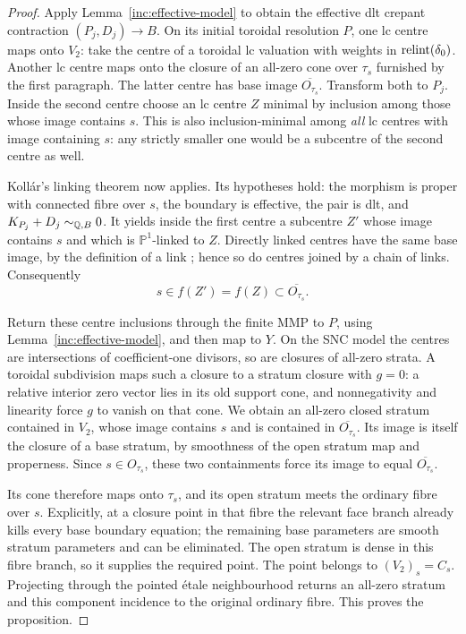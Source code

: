 \begin{proof}
Apply Lemma~\ref{inc:effective-model} to obtain the effective dlt
crepant contraction $(P_j,D_j)\to B$.  On its initial toroidal
resolution $P$, one lc centre maps onto $V_2$: take the centre of
a toroidal lc valuation with weights in $\operatorname{relint}(\delta_0)$.
Another lc centre maps onto the closure of an all-zero cone over
$\tau_s$ furnished by the first paragraph.  The latter centre has
base image $\overline{O_{\tau_s}}$.  Transform both to $P_j$.
Inside the second centre choose an lc centre $Z$ minimal by inclusion
among those whose image contains $s$.  This is also inclusion-minimal
among \emph{all} lc centres with image containing $s$: any strictly
smaller one would be a subcentre of the second centre as well.

Koll\'{a}r's linking theorem \cite[Theorem~10]{KollarSources} now
applies.  Its hypotheses hold: the morphism is proper with connected
fibre over $s$, the boundary is effective, the pair is dlt, and
$K_{P_j}+D_j\sim_{\mathbb Q,B}0$.  It yields inside the first centre a
subcentre $Z'$ whose image contains $s$ and which is $\mathbb P^1$-linked
to $Z$.  Directly linked centres have the same base image, by the
definition of a link \cite[Definition~9]{KollarSources}; hence so do
centres joined by a chain of links.  Consequently
\[
 s\in f(Z')=f(Z)\subset\overline{O_{\tau_s}}.
\]

Return these centre inclusions through the finite MMP to $P$, using
Lemma~\ref{inc:effective-model}, and then map to $Y$.  On the SNC
model the centres are intersections of coefficient-one divisors,
so are closures of all-zero strata.  A toroidal subdivision maps
such a closure to a stratum closure with $g=0$: a relative interior
zero vector lies in its old support cone, and nonnegativity and
linearity force $g$ to vanish on that cone.  We obtain an all-zero
closed stratum contained in $V_2$, whose image contains $s$ and is
contained in $\overline{O_{\tau_s}}$.  Its image is itself the closure
of a base stratum, by smoothness of the open stratum map and
properness.  Since $s\in O_{\tau_s}$, these two containments force
its image to equal $\overline{O_{\tau_s}}$.

Its cone therefore maps onto $\tau_s$, and its open stratum meets
the ordinary fibre over $s$.  Explicitly, at a closure point in
that fibre the relevant face branch already kills every base
boundary equation; the remaining base parameters are smooth
stratum parameters and can be eliminated.  The open stratum is
dense in this fibre branch, so it supplies the required point.
The point belongs to $(V_2)_s=C_s$.  Projecting through the
pointed \'{e}tale neighbourhood returns an all-zero stratum and
this component incidence to the original ordinary fibre.  This
proves the proposition.
\end{proof}

